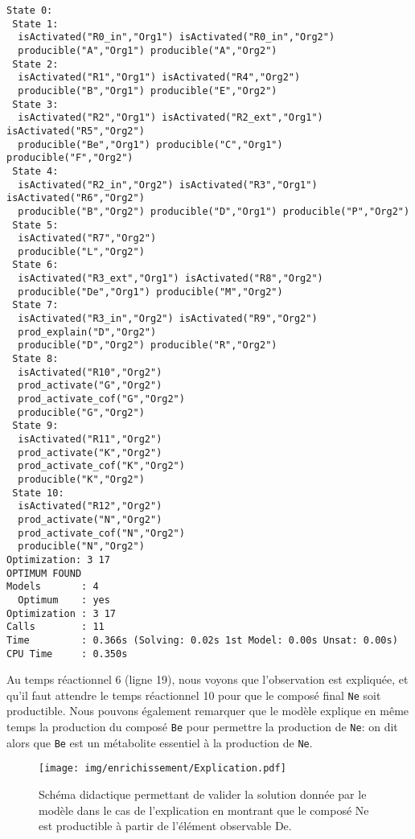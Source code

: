 \documentclass[../main.tex]{subfiles}
\begin{document}
\begin{lstlisting}[label=explication, caption=Résultat de l'explication obtenue après application des règles sur la base de faits didactique, captionpos=b]
 State 0:
 State 1:
  isActivated("R0_in","Org1") isActivated("R0_in","Org2")
  producible("A","Org1") producible("A","Org2")
 State 2:
  isActivated("R1","Org1") isActivated("R4","Org2")
  producible("B","Org1") producible("E","Org2")
 State 3:
  isActivated("R2","Org1") isActivated("R2_ext","Org1") isActivated("R5","Org2")
  producible("Be","Org1") producible("C","Org1") producible("F","Org2")
 State 4:
  isActivated("R2_in","Org2") isActivated("R3","Org1") isActivated("R6","Org2")
  producible("B","Org2") producible("D","Org1") producible("P","Org2")
 State 5:
  isActivated("R7","Org2")
  producible("L","Org2")
 State 6:
  isActivated("R3_ext","Org1") isActivated("R8","Org2")
  producible("De","Org1") producible("M","Org2")
 State 7:
  isActivated("R3_in","Org2") isActivated("R9","Org2")
  prod_explain("D","Org2")
  producible("D","Org2") producible("R","Org2")
 State 8:
  isActivated("R10","Org2")
  prod_activate("G","Org2")
  prod_activate_cof("G","Org2")
  producible("G","Org2")
 State 9:
  isActivated("R11","Org2")
  prod_activate("K","Org2")
  prod_activate_cof("K","Org2")
  producible("K","Org2")
 State 10:
  isActivated("R12","Org2")
  prod_activate("N","Org2")
  prod_activate_cof("N","Org2")
  producible("N","Org2")
Optimization: 3 17
OPTIMUM FOUND
Models       : 4
  Optimum    : yes
Optimization : 3 17
Calls        : 11
Time         : 0.366s (Solving: 0.02s 1st Model: 0.00s Unsat: 0.00s)
CPU Time     : 0.350s

\end{lstlisting}
Au temps réactionnel 6 (ligne 19), nous voyons que l'observation est expliquée, et qu'il faut attendre le temps réactionnel 10 pour que le composé final \texttt{Ne} soit productible. Nous pouvons également remarquer que le modèle explique en même temps la production du composé \texttt{Be} pour permettre la production de \texttt{Ne}: on dit alors que \texttt{Be} est un métabolite essentiel à la production de \texttt{Ne}.

\begin{figure}[H]
    \begin{center}
        \texttt{[image: img/enrichissement/Explication.pdf]}
            \caption{Schéma didactique permettant de valider la solution donnée par le modèle dans le cas de l'explication en montrant que le composé Ne est productible à partir de l'élément observable De.}
        \label{fig:explication}
    \end{center}
\end{figure}
    
\end{document}
